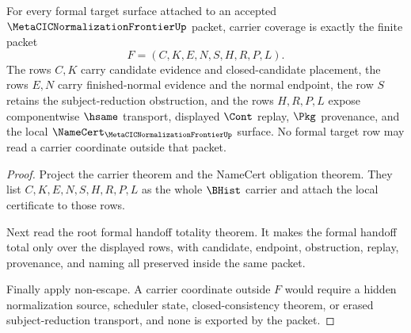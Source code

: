 \begin{theorem}
\label{thm:metacic-normalization-frontier-formal-target-carrier-coverage}
For every formal target surface attached to an accepted $\MetaCICNormalizationFrontierUp$ packet, carrier coverage is exactly the finite packet
$$
F=(C,K,E,N,S,H,R,P,L).
$$
The rows $C,K$ carry candidate evidence and closed-candidate placement, the rows $E,N$ carry finished-normal evidence and the normal endpoint, the row $S$ retains the subject-reduction obstruction, and the rows $H,R,P,L$ expose componentwise $\hsame$ transport, displayed $\Cont$ replay, $\Pkg$ provenance, and the local $\NameCert_{\MetaCICNormalizationFrontierUp}$ surface. No formal target row may read a carrier coordinate outside that packet.
\end{theorem}
\begin{proof}
Project the carrier theorem and the NameCert obligation theorem. They list $C,K,E,N,S,H,R,P,L$ as the whole $\BHist$ carrier and attach the local certificate to those rows.

Next read the root formal handoff totality theorem. It makes the formal handoff total only over the displayed rows, with candidate, endpoint, obstruction, replay, provenance, and naming all preserved inside the same packet.

Finally apply non-escape. A carrier coordinate outside $F$ would require a hidden normalization source, scheduler state, closed-consistency theorem, or erased subject-reduction transport, and none is exported by the packet.
\end{proof}


